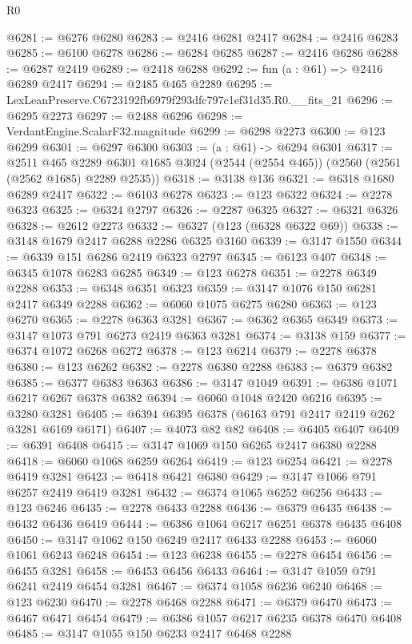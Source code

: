 \begin{lexlean}{R0}
\begin{coremodule}
@6281 := @6276 @6280
@6283 := @2416 @6281 @2417
@6284 := @2416 @6283
@6285 := @6100 @6278
@6286 := @6284 @6285
@6287 := @2416 @6286
@6288 := @6287 @2419
@6289 := @2418 @6288
@6292 := fun (a : @61) => @2416 @6289 @2417
@6294 := @2485 @465 @2289
@6295 := LexLeanPreserve.C6723192fb6979f293dfc797c1ef31d35.R0.__fits_21
@6296 := @6295 @2273
@6297 := @2488 @6296
@6298 := VerdantEngine.ScalarF32.magnitude
@6299 := @6298 @2273
@6300 := @123 @6299
@6301 := @6297 @6300
@6303 := (a : @61) -> @6294 @6301
@6317 := @2511
    @465
    @2289
    @6301
    @1685
    @3024
    (@2544 (@2554 @465))
    (@2560 (@2561 (@2562 @1685) @2289 @2535))
@6318 := @3138 @136
@6321 := @6318 @1680 @6289 @2417
@6322 := @6103 @6278
@6323 := @123 @6322
@6324 := @2278 @6323
@6325 := @6324 @2797
@6326 := @2287 @6325
@6327 := @6321 @6326
@6328 := @2612 @2273
@6332 := @6327 (@123 (@6328 @6322 @69))
@6338 := @3148 @1679 @2417 @6288 @2286 @6325 @3160
@6339 := @3147 @1550
@6344 := @6339 @151 @6286 @2419 @6323 @2797
@6345 := @6123 @407
@6348 := @6345 @1078 @6283 @6285
@6349 := @123 @6278
@6351 := @2278 @6349 @2288
@6353 := @6348 @6351 @6323
@6359 := @3147 @1076 @150 @6281 @2417 @6349 @2288
@6362 := @6060 @1075 @6275 @6280
@6363 := @123 @6270
@6365 := @2278 @6363 @3281
@6367 := @6362 @6365 @6349
@6373 := @3147 @1073 @791 @6273 @2419 @6363 @3281
@6374 := @3138 @159
@6377 := @6374 @1072 @6268 @6272
@6378 := @123 @6214
@6379 := @2278 @6378
@6380 := @123 @6262
@6382 := @2278 @6380 @2288
@6383 := @6379 @6382
@6385 := @6377 @6383 @6363
@6386 := @3147 @1049
@6391 := @6386 @1071 @6217 @6267 @6378 @6382
@6394 := @6060 @1048 @2420 @6216
@6395 := @3280 @3281
@6405 := @6394 @6395 @6378 (@6163 @791 @2417 @2419 @262 @3281 @6169 @6171)
@6407 := @4073 @82 @82
@6408 := @6405 @6407
@6409 := @6391 @6408
@6415 := @3147 @1069 @150 @6265 @2417 @6380 @2288
@6418 := @6060 @1068 @6259 @6264
@6419 := @123 @6254
@6421 := @2278 @6419 @3281
@6423 := @6418 @6421 @6380
@6429 := @3147 @1066 @791 @6257 @2419 @6419 @3281
@6432 := @6374 @1065 @6252 @6256
@6433 := @123 @6246
@6435 := @2278 @6433 @2288
@6436 := @6379 @6435
@6438 := @6432 @6436 @6419
@6444 := @6386 @1064 @6217 @6251 @6378 @6435 @6408
@6450 := @3147 @1062 @150 @6249 @2417 @6433 @2288
@6453 := @6060 @1061 @6243 @6248
@6454 := @123 @6238
@6455 := @2278 @6454
@6456 := @6455 @3281
@6458 := @6453 @6456 @6433
@6464 := @3147 @1059 @791 @6241 @2419 @6454 @3281
@6467 := @6374 @1058 @6236 @6240
@6468 := @123 @6230
@6470 := @2278 @6468 @2288
@6471 := @6379 @6470
@6473 := @6467 @6471 @6454
@6479 := @6386 @1057 @6217 @6235 @6378 @6470 @6408
@6485 := @3147 @1055 @150 @6233 @2417 @6468 @2288

\end{coremodule}
\end{lexlean}
